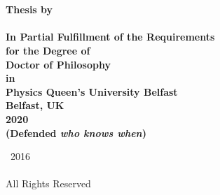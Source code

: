 


\thispagestyle{empty}

\begingroup
\centering
{}
~
\\[1em]
\sffamily\bfseries\fontsize{26}{31.2}\selectfont
\DocumentTitle
\\[0.4in]
\normalfont\large
Thesis by
\\[0.25em]
\sffamily\bfseries\Large
\AuthorName
\\[0.4in]
\normalfont\normalsize
In Partial Fulfillment of the Requirements
\\[0.5em]
for the Degree of
\\[0.5em]
Doctor of Philosophy
\\[0.5em]
in
\\[0.5em]
Physics
\vfill
Queen's University Belfast
\\[0.5em]
Belfast, UK
\\[1.5em]
2020
\\[0.5em]
(Defended \emph{\textbf{who knows when}})
\par
\endgroup

\clearpage


\pagestyle{plain}
\setcounter{page}{2}

\begingroup
\centering
{}
\null
\vfill
{\sffamily\textcopyright}~2016
\\[0.5em]
\AuthorName
\\[0.5em]
All Rights Reserved
\par
\endgroup

\clearpage




